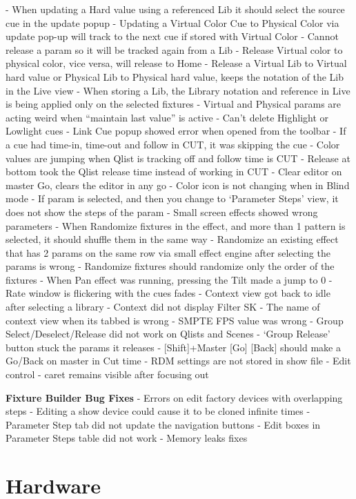 \documentclass[
]{article}
\begin{document}
- When updating a Hard value using a referenced Lib it should select the source cue in the update popup
- Updating a Virtual Color Cue to Physical Color via update pop-up will track to the next cue if stored with Virtual Color
- Cannot release a param so it will be tracked again from a Lib
- Release Virtual color to physical color, vice versa, will release to Home
- Release a Virtual Lib to Virtual hard value or Physical Lib to Physical hard value, keeps the notation of the Lib in the Live view
- When storing a Lib, the Library notation and reference in Live is being applied only on the selected fixtures
- Virtual and Physical params are acting weird when ``maintain last value'' is active
- Can't delete Highlight or Lowlight cues
- Link Cue popup showed error when opened from the toolbar
- If a cue had time-in, time-out and follow in CUT, it was skipping the cue
- Color values are jumping when Qlist is tracking off and follow time is CUT
- Release at bottom took the Qlist release time instead of working in CUT
- Clear editor on master Go, clears the editor in any go
- Color icon is not changing when in Blind mode
- If param is selected, and then you change to `Parameter Steps' view, it does not show the steps of the param
- Small screen effects showed wrong parameters
- When Randomize fixtures in the effect, and more than 1 pattern is selected, it should shuffle them in the same way
- Randomize an existing effect that has 2 params on the same row via small effect engine after selecting the params is wrong
- Randomize fixtures should randomize only the order of the fixtures
- When Pan effect was running, pressing the Tilt made a jump to 0
- Rate window is flickering with the cues fades
- Context view got back to idle after selecting a library
- Context did not display Filter SK
- The name of context view when its tabbed is wrong
- SMPTE FPS value was wrong
- Group Select/Deselect/Release did not work on Qlists and Scenes
- `Group Release' button stuck the params it releases
- {[}Shift{]}+Master {[}Go{]} {[}Back{]} should make a Go/Back on master in Cut time
- RDM settings are not stored in show file
- Edit control - caret remains visible after focusing out

\textbf{Fixture Builder Bug Fixes}
- Errors on edit factory devices with overlapping steps
- Editing a show device could cause it to be cloned infinite times
- Parameter Step tab did not update the navigation buttons
- Edit boxes in Parameter Steps table did not work
- Memory leaks fixes

\hypertarget{hardware}{%
\section{Hardware}\label{hardware}}
\end{document}
